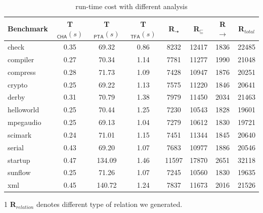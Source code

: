 \documentclass{fac}
\newcommand{\less}{\sqsubseteq}
\newcommand{\tflow}{\dashrightarrow}
\begin{document}

\begin{table} %
\centering
\begin{threeparttable}[b]
\begin{tabular}{lccccccc}
	\hline
	\textbf{Benchmark} & \hspace{-2pt}\textbf{T$_{\textsf{CHA}}(s)$}& \hspace{-2pt}\textbf{T$_{\textsf{PTA}}(s)$} & \hspace{-2pt}\textbf{T$_{\textsf{TFA}}(s)$} & \hspace{2pt}\textbf{R$_{\tflow}$}\hspace{2pt} & \hspace{2pt}\textbf{R$_{\less}$}\hspace{2pt} & \hspace{2pt}\textbf{R${\rightarrow}$}\hspace{2pt} &\textbf{R$_{total}$}\\
	\hline
check & 0.35 & 69.32 & 0.86 & 8232 & 12417 & 1836 & 22485\\
compiler & 0.27 & 70.34 & 1.14 & 7781 & 11277 & 1990 & 21048\\
compress & 0.28 & 71.73 & 1.09 & 7428 & 10947 & 1876 & 20251\\
crypto & 0.25 & 69.22 & 1.13 & 7575 & 11220 & 1846 & 20641\\
derby & 0.31 & 70.79 & 1.38 & 7979 & 11450 & 2034 & 21463\\
helloworld & 0.25 & 70.44 & 1.25 & 7230 & 10543 & 1828 & 19601\\
mpegaudio & 0.25 & 69.13 & 1.04 & 7279 & 10612 & 1830 & 19721\\
scimark & 0.24 & 71.01 & 1.15 & 7451 & 11344 & 1845 & 20640\\
serial & 0.43 & 69.20 & 1.07 & 7683 & 10977 & 1886 & 20546\\
startup & 0.47 & 134.09 & 1.46 & 11597 & 17870 & 2651 & 32118\\
sunflow & 0.25 & 71.26 & 1.07 & 7245 & 10560 & 1830 & 19635\\
xml & 0.45 & 140.72 & 1.24 & 7837 & 11673 & 2016 & 21526\\
	\hline
\end{tabular}
\begin{tablenotes}
  \item[1] \textbf{R}$_{relation}$ denotes different type of relation we generated.
\end{tablenotes}
\caption{run-time cost with different analysis}
\label{table:TimeCost}
\end{threeparttable}
\end{table}
\end{document}
